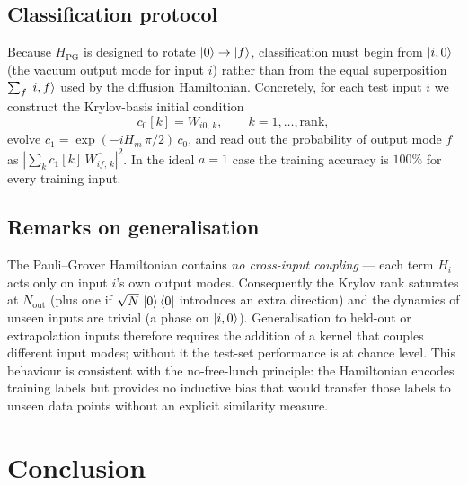 \documentclass[11pt, a4paper]{article}
\begin{document}
\subsection{Classification protocol}

Because $H_{\mathrm{PG}}$ is designed to rotate $\ket{0}\to\ket{f}$,
classification must begin from $\ket{i,0}$ (the vacuum output mode for
input $i$) rather than from the equal superposition $\sum_f\ket{i,f}$ used
by the diffusion Hamiltonian.  Concretely, for each test input $i$ we
construct the Krylov-basis initial condition
\[
c_0[k] = W_{i0,\,k},\qquad k=1,\dots,\mathrm{rank},
\]
evolve $c_1 = \exp(-i H_m\,\pi/2)\,c_0$, and read out the probability of
output mode $f$ as $|\sum_k c_1[k]\,\overline{W_{if,\,k}}|^2$.  In the
ideal $a=1$ case the training accuracy is $100\%$ for every training input.

\subsection{Remarks on generalisation}

The Pauli--Grover Hamiltonian contains \emph{no cross-input coupling} —
each term $H_i$ acts only on input $i$'s own output modes.  Consequently
the Krylov rank saturates at $N_{\mathrm{out}}$ (plus one if
$\sqrt{N}\,\ket{0}\bra{0}$ introduces an extra direction) and the dynamics
of unseen inputs are trivial (a phase on $\ket{i,0}$).  Generalisation to
held-out or extrapolation inputs therefore requires the addition of a
kernel that couples different input modes; without it the test-set
performance is at chance level.  This behaviour is consistent with the
no-free-lunch principle: the Hamiltonian encodes training labels but
provides no inductive bias that would transfer those labels to unseen data
points without an explicit similarity measure.

\section{Conclusion}
\end{document}
